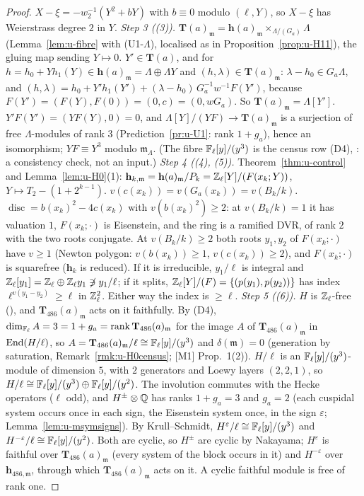 \documentclass[11pt]{article}
\newcommand{\Iw}{\Lambda}                         %
\newcommand{\hcusp}{\mathbf{h}}                   %
\newcommand{\Tu}{\mathbf{T}}                      %
\newcommand{\Pk}[1]{P_{#1}}                       %
\newcommand{\Zl}{\Z_\ell}
\begin{document}
\begin{proof}
$X-\xi=-w_2^{-1}(Y^{2}+bY)$ with $b\equiv0$ modulo $(\ell,Y)$, so $X-\xi$ has Weierstrass degree $2$ in $Y$.
\emph{Step 3 ((3)).} $\Tu(a)_{\mathfrak m}=\hcusp(a)_{\mathfrak m}\times_{\Iw/(G_a)}\Iw$ (Lemma~\ref{lem:u-fibre} with (U1-$\Iw$), localised as in Proposition~\ref{prop:u-H11}), the gluing map
sending $Y\mapsto0$. $Y'\in\Tu(a)$, and for $h=h_0+Yh_1(Y)\in\hcusp(a)_{\mathfrak m}=\Iw\oplus\Iw Y$ and $(h,\lambda)\in\Tu(a)_{\mathfrak m}$: $\lambda-h_0\in G_a\Iw$, and
$(h,\lambda)=h_0+Y'h_1(Y')+(\lambda-h_0)\,G_a^{-1}w^{-1}F(Y')$, because $F(Y')=(F(Y),F(0))=(0,c)=(0,wG_a)$. So $\Tu(a)_{\mathfrak m}=\Iw[Y']$. $Y'F(Y')=(YF(Y),0)=0$, and
$\Iw[Y]/(YF)\to\Tu(a)_{\mathfrak m}$ is a surjection of free $\Iw$-modules of rank $3$ (Prediction~\ref{pr:u-U1}: rank $1+g_a$), hence an isomorphism; $YF\equiv Y^{3}$ modulo
$\mathfrak m_\Iw$. (The fibre $\mathbb{F}_\ell[y]/(y^{3})$ is the census row (D4), : a consistency check, not an input.)
\emph{Step 4 ((4), (5)).} Theorem~\ref{thm:u-control} and Lemma~\ref{lem:u-H0}(1): $\hcusp_{k,\mathfrak m}=\hcusp(a)_{\mathfrak m}/\Pk k=\Zl[Y]/(F(x_k;Y))$, $Y\mapsto T_2-(1+2^{k-1})$.
$v(c(x_k))=v(G_a(x_k))=v(B_k/k)$. $\operatorname{disc}=b(x_k)^{2}-4c(x_k)$ with $v(b(x_k)^{2})\ge2$: at $v(B_k/k)=1$ it has valuation $1$, $F(x_k;\cdot)$ is Eisenstein, and the ring is a
ramified DVR, of rank $2$ with the two roots conjugate. At $v(B_k/k)\ge2$ both roots $y_1,y_2$ of $F(x_k;\cdot)$ have $v\ge1$ (Newton polygon: $v(b(x_k))\ge1$, $v(c(x_k))\ge2$), and
$F(x_k;\cdot)$ is squarefree ($\hcusp_k$ is reduced). If it is irreducible, $y_1/\ell$ is integral and $\Zl[y_1]=\Zl\oplus\Zl y_1\not\ni y_1/\ell$; if it splits,
$\Zl[Y]/(F)=\{(p(y_1),p(y_2))\}$ has index $\ell^{v(y_1-y_2)}\ge\ell$ in $\Zl^{2}$. Either way the index is $\ge\ell$.
\emph{Step 5 ((6)).} $H$ is $\Zl$-free (), and $\Tu_{486}(a)_{\mathfrak m}$ acts on it faithfully. By (D4), $\dim_{\Fl}A=3=1+g_a=\rank\Tu_{486}(a)_{\mathfrak m}$
for the image $A$ of $\Tu_{486}(a)_{\mathfrak m}$ in $\mathrm{End}(H/\ell)$, so $A=\Tu_{486}(a)_{\mathfrak m}/\ell\cong\Fl[y]/(y^{3})$ and $\delta(\mathfrak m)=0$ (generation by saturation,
Remark~\ref{rmk:u-H0census}; [M1] Prop.~1(2)). $H/\ell$ is an $\mathbb{F}_\ell[y]/(y^{3})$-module of dimension $5$, with $2$ generators and Loewy layers $(2,2,1)$, so $H/\ell\cong\mathbb{F}_\ell[y]/(y^{3})\oplus
\mathbb{F}_\ell[y]/(y^{2})$. The involution commutes with the Hecke operators ($\ell$ odd), and $H^{\pm}\otimes\mathbb{Q}$ has ranks $1+g_a=3$ and $g_a=2$ (each cuspidal system occurs once in each sign,
the Eisenstein system once, in the sign $\varepsilon$; Lemma~\ref{lem:u-msymsigns}). By Krull--Schmidt, $H^{\varepsilon}/\ell\cong\mathbb{F}_\ell[y]/(y^{3})$ and $H^{-\varepsilon}/\ell\cong\mathbb{F}_\ell[y]/(y^{2})$. Both
are cyclic, so $H^{\pm}$ are cyclic by Nakayama; $H^{\varepsilon}$ is faithful over $\Tu_{486}(a)_{\mathfrak m}$ (every system of the block occurs in it) and $H^{-\varepsilon}$ over
$\hcusp_{486,\mathfrak m}$, through which $\Tu_{486}(a)_{\mathfrak m}$ acts on it. A cyclic faithful module is free of rank one.
\end{proof}
\end{document}
